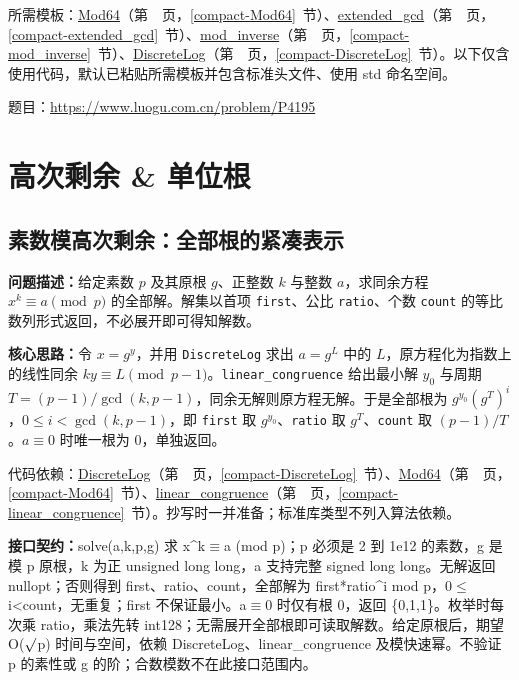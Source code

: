 所需模板：\hyperref[compact-Mod64]{Mod64}（第~\pageref{compact-Mod64}~页，\ref{compact-Mod64}~节）、\hyperref[compact-extended_gcd]{extended\_\allowbreak{}gcd}（第~\pageref{compact-extended_gcd}~页，\ref{compact-extended_gcd}~节）、\hyperref[compact-mod_inverse]{mod\_\allowbreak{}inverse}（第~\pageref{compact-mod_inverse}~页，\ref{compact-mod_inverse}~节）、\hyperref[compact-DiscreteLog]{DiscreteLog}（第~\pageref{compact-DiscreteLog}~页，\ref{compact-DiscreteLog}~节）。以下仅含使用代码，默认已粘贴所需模板并包含标准头文件、使用 std 命名空间。

题目：\url{https://www.luogu.com.cn/problem/P4195}



\Needspace{523pt}

\section{高次剩余 \& 单位根}

\subsection{素数模高次剩余：全部根的紧凑表示}\label{compact-KthResidue}

\noindent\textbf{问题描述：}\allowbreak 给定素数 $p$ 及其原根 $g$、正整数 $k$ 与整数 $a$，求同余方程 $x^k\equiv a\pmod p$ 的全部解。解集以首项 \texttt{first}、公比 \texttt{ratio}、个数 \texttt{count} 的等比数列形式返回，不必展开即可得知解数。

\textbf{核心思路：}\allowbreak 令 $x=g^y$，并用 \texttt{DiscreteLog} 求出 $a=g^L$ 中的 $L$，原方程化为指数上的线性同余 $ky\equiv L\pmod{p-1}$。\texttt{linear\_congruence} 给出最小解 $y_0$ 与周期 $T=(p-1)/\gcd(k,p-1)$，同余无解则原方程无解。于是全部根为 $g^{y_0}(g^T)^i$，$0\le i<\gcd(k,p-1)$，即 \texttt{first} 取 $g^{y_0}$、\texttt{ratio} 取 $g^T$、\texttt{count} 取 $(p-1)/T$。$a\equiv0$ 时唯一根为 0，单独返回。

代码依赖：\hyperref[compact-DiscreteLog]{DiscreteLog}（第~\pageref{compact-DiscreteLog}~页，\ref{compact-DiscreteLog}~节）、\hyperref[compact-Mod64]{Mod64}（第~\pageref{compact-Mod64}~页，\ref{compact-Mod64}~节）、\hyperref[compact-linear_congruence]{linear\_\allowbreak{}congruence}（第~\pageref{compact-linear_congruence}~页，\ref{compact-linear_congruence}~节）。抄写时一并准备；标准库类型不列入算法依赖。

{\sloppy{}\noindent\textbf{接口契约：}solve(a,k,p,g) 求 x\textasciicircum{}k$\equiv$a (mod p)；p 必须是 2 到 1e12 的素数，g 是模 p 原根，k 为正 unsigned long long，a 支持完整 signed long long。无解返回 nullopt；否则得到 first、ratio、count，全部解为 first*ratio\textasciicircum{}i mod p，0$\le$i<count，无重复；first 不保证最小。a$\equiv$0 时仅有根 0，返回 \{0,1,1\}。枚举时每次乘 ratio，乘法先转 int128；无需展开全部根即可读取解数。给定原根后，期望 O($\sqrt{\vphantom x}$p) 时间与空间，依赖 DiscreteLog、linear\_congruence 及模快速幂。不验证 p 的素性或 g 的阶；合数模数不在此接口范围内。\par}

